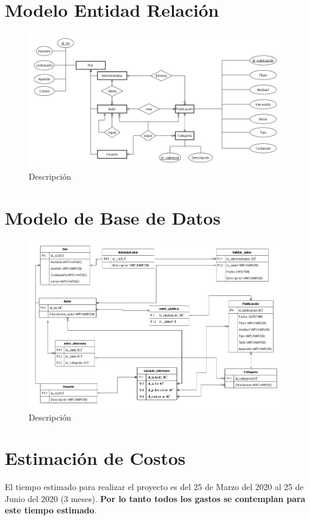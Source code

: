 \documentclass[a4paper,12 pt]{article}
\begin{document}
\begin{landscape}
\section{Modelo Entidad Relación}
    \begin{figure}[H]
        \centering
        \includegraphics[scale = 0.7]{images/ERD.png}
        \caption{Descripción}
        \label{F13}
    \end{figure}{}

\section{Modelo de Base de Datos}
    \begin{figure}[H]
        \centering
        \includegraphics[scale = 0.55]{images/Diagr_BD.png}
        \caption{Descripción}
        \label{F11}
    \end{figure}{}
\end{landscape}

\section{Estimación de Costos}
El tiempo estimado para realizar el proyecto es del 25 de Marzo del 2020 al 25 de Junio
del 2020 (3 meses). \textbf{Por lo tanto todos los gastos se contemplan para este tiempo
estimado}.\\
\end{document}
